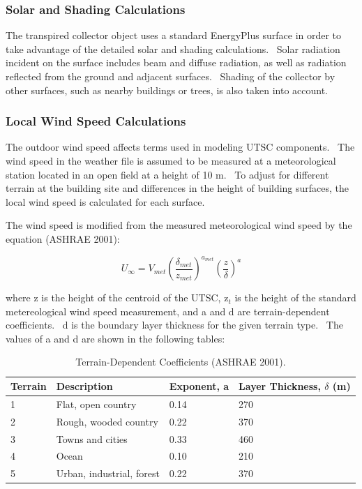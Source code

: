 \subsubsection{Solar and Shading Calculations}\label{solar-and-shading-calculations-2}

The transpired collector object uses a standard EnergyPlus surface in order to take advantage of the detailed solar and shading calculations.~ Solar radiation incident on the surface includes beam and diffuse radiation, as well as radiation reflected from the ground and adjacent surfaces.~ Shading of the collector by other surfaces, such as nearby buildings or trees, is also taken into account.

\subsubsection{Local Wind Speed Calculations}\label{local-wind-speed-calculations-000}

The outdoor wind speed affects terms used in modeling UTSC components.~ The wind speed in the weather file is assumed to be measured at a meteorological station located in an open field at a height of 10 m.~ To adjust for different terrain at the building site and differences in the height of building surfaces, the local wind speed is calculated for each surface.

The wind speed is modified from the measured meteorological wind speed by the equation (ASHRAE 2001):

\begin{equation}
{U_\infty } = {V_{met}}{\left( {\frac{{{\delta_{met}}}}{{{z_{met}}}}} \right)^{{a_{met}}}}{\left( {\frac{z}{\delta }} \right)^a}
\end{equation}

where z is the height of the centroid of the UTSC, z\(_{t}\) is the height of the standard metereological wind speed measurement, and a and d are terrain-dependent coefficients.~ d is the boundary layer thickness for the given terrain type.~ The values of a and d are shown in the following tables:

\begin{longtable}[c]{@{}llll@{}}
\caption{Terrain-Dependent Coefficients (ASHRAE 2001). \protect \label{table:terrain-dependent-coefficients-ashrae-2001.-001}}\\
\toprule 
Terrain & Description & Exponent, a & Layer Thickness, $\delta$ (m) \tabularnewline \midrule
\endhead
1 & Flat, open country & 0.14 & 270 \tabularnewline
2 & Rough, wooded country & 0.22 & 370 \tabularnewline
3 & Towns and cities & 0.33 & 460 \tabularnewline
4 & Ocean & 0.10 & 210 \tabularnewline
5 & Urban, industrial, forest & 0.22 & 370 \tabularnewline
\bottomrule
\end{longtable}

